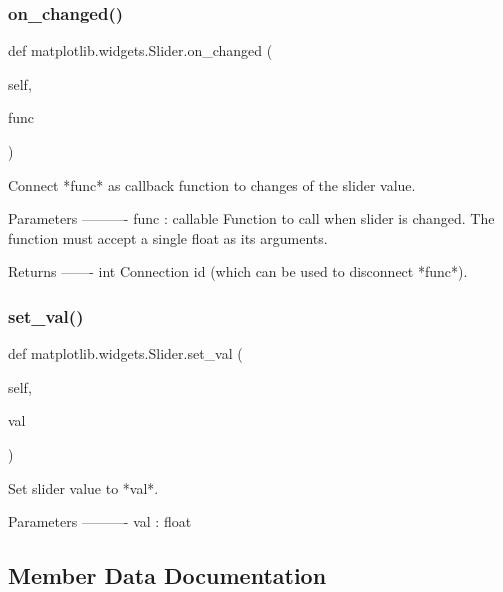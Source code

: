 \subsubsection{\texorpdfstring{on\+\_\+changed()}{on\_changed()}}
{\footnotesize\ttfamily def matplotlib.\+widgets.\+Slider.\+on\+\_\+changed (\begin{DoxyParamCaption}\item[{}]{self,  }\item[{}]{func }\end{DoxyParamCaption})}

\begin{DoxyVerb}Connect *func* as callback function to changes of the slider value.

Parameters
----------
func : callable
    Function to call when slider is changed.
    The function must accept a single float as its arguments.

Returns
-------
int
    Connection id (which can be used to disconnect *func*).
\end{DoxyVerb}
 \mbox{\label{classmatplotlib_1_1widgets_1_1Slider_a9bc3882a41ec056bbe927ab2103e44b7}} 
\subsubsection{\texorpdfstring{set\+\_\+val()}{set\_val()}}
{\footnotesize\ttfamily def matplotlib.\+widgets.\+Slider.\+set\+\_\+val (\begin{DoxyParamCaption}\item[{}]{self,  }\item[{}]{val }\end{DoxyParamCaption})}

\begin{DoxyVerb}Set slider value to *val*.

Parameters
----------
val : float
\end{DoxyVerb}
 

\subsection{Member Data Documentation}
\mbox{\label{classmatplotlib_1_1widgets_1_1Slider_a2d53683bfa871b02db2d34bb040ce4c9}} 
